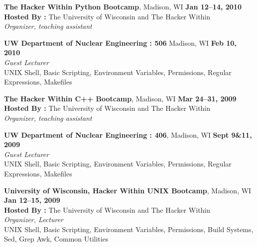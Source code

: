 \documentclass[margin,line]{resume}
\begin{document}
\begin{resume}
    \textbf{The Hacker Within Python Bootcamp}, Madison, WI \hfill \textbf{Jan 12--14, 2010}\\
               \textbf{Hosted By : } The University of Wisconsin and The Hacker Within\\
               \textsl{Organizer, teaching assistant}

    \textbf{UW Department of Nuclear Engineering : 506} Madison, WI \hfill \textbf{Feb 10, 2010}\\ 
               \textsl{Guest Lecturer}\\
               UNIX Shell, Basic Scripting, Environment Variables, Permissions, 
               Regular Expressions, Makefiles 

    \textbf{The Hacker Within C++ Bootcamp}, Madison, WI \hfill \textbf{Mar 24--31, 2009}\\
               \textbf{Hosted By : } The University of Wisconsin and The Hacker Within\\
               \textsl{Organizer, teaching assistant}

    \textbf{UW Department of Nuclear Engineering : 406}, Madison, WI \hfill \textbf{Sept 9\&11, 2009}\\ 
               \textsl{Guest Lecturer}\\
               UNIX Shell, Basic Scripting, Environment Variables, Permissions, 
               Regular Expressions, Makefiles 

    \textbf{University of Wisconsin, Hacker Within UNIX Bootcamp}, Madison, WI \hfill \textbf{Jan 12--15, 2009}\\
               \textbf{Hosted By : } The University of Wisconsin and The Hacker Within\\
               \textsl{Organizer, Lecturer}\\
               UNIX Shell, Basic Scripting, Environment Variables, Permissions, Build Systems, 
               Sed, Grep Awk, Common Utilities
    \pagebreak

\end{resume}
\end{document}
